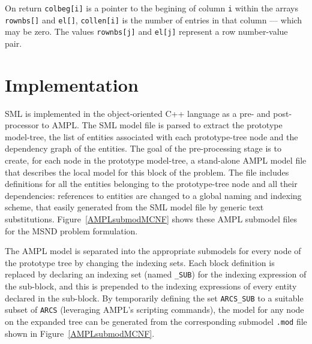 \documentclass[10pt,a4paper]{book}
\begin{document}
On return {\tt colbeg[i]} is a pointer to the begining of column {\tt i}
within the arrays {\tt rownbs[]} and {\tt el[]}, {\tt collen[i]} is the number
of entries in that column --- which may be zero. The values {\tt rownbs[j]} and
{\tt el[j]} represent a row number-value pair.

\section{Implementation} \label{implementation}

SML is implemented in the object-oriented C++ language as a
pre- and post-processor to AMPL.  
The SML model file
is parsed to extract the prototype model-tree, the list of entities
associated with each prototype-tree node and the dependency graph of
the entities. 
The goal of the pre-processing stage is to create, for each node in the
prototype model-tree, a stand-alone AMPL model file that describes the
local model for this block of the problem. 
The file includes definitions for all the
entities belonging to the prototype-tree node and all their
dependencies: references to entities are changed to a
global naming and indexing scheme, that easily generated from the
SML model file by generic text substitutions.  
Figure~\ref{AMPLsubmodMCNF} shows these AMPL submodel files for the MSND problem formulation. 

The AMPL model is separated into the appropriate submodels for every node
of the prototype tree by changing the indexing sets.
Each block definition is replaced
by declaring an indexing set (named {\tt *\_SUB}) for the
indexing expression of the sub-block, and this is prepended to the
indexing expressions of every entity declared in the sub-block. By
temporarily defining the set {\tt ARCS\_SUB} to a suitable subset of {\tt ARCS} 
(leveraging AMPL's scripting commands), the
model for any node on the expanded tree can be generated from the
corresponding submodel {\tt *.mod} file shown in Figure~\ref{AMPLsubmodMCNF}.
\end{document}
